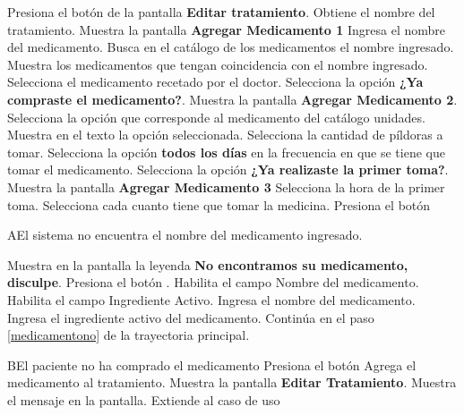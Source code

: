 \begin{UCtrayectoria}
	
	\UCpaso [\UCactor] Presiona el botón  de la pantalla \textbf{Editar tratamiento}.
	\UCpaso Obtiene el nombre del tratamiento.
	\UCpaso Muestra la pantalla \textbf{Agregar Medicamento 1}
	\UCpaso [\UCactor] Ingresa el nombre del medicamento.
	\UCpaso Busca en el catálogo de los medicamentos el nombre ingresado.
	\UCpaso Muestra los medicamentos que tengan coincidencia con el nombre ingresado.
	\UCpaso [\UCactor] Selecciona el medicamento recetado por el doctor.
	\UCpaso [\UCactor] Selecciona la opción \textbf{¿Ya compraste el medicamento?}.  \label{medicamentono}
	\UCpaso Muestra la pantalla \textbf{Agregar Medicamento 2}.
	\UCpaso [\UCactor] Selecciona la opción que corresponde al medicamento del catálogo unidades.
	\UCpaso Muestra en el texto la opción seleccionada.
	\UCpaso [\UCactor] Selecciona la cantidad de píldoras a tomar.
	\UCpaso [\UCactor] Selecciona la opción \textbf{todos los días} en la frecuencia en que se tiene que tomar el medicamento.
	\UCpaso [\UCactor] Selecciona la opción \textbf{¿Ya realizaste la primer toma?}. \label{frecuencia}
	\UCpaso Muestra la pantalla \textbf{Agregar Medicamento 3}
	\UCpaso [\UCactor] Selecciona la hora de la primer toma.
	\UCpaso [\UCactor] Selecciona cada cuanto tiene que tomar la medicina.
	\UCpaso [\UCactor] Presiona el botón 
	
\end{UCtrayectoria}

\begin{UCtrayectoriaA}{A}{El sistema no encuentra el nombre del medicamento ingresado.}
	
	\UCpaso Muestra en la pantalla la leyenda \textbf{No encontramos su medicamento, disculpe}.
	\UCpaso[\UCactor] Presiona el botón .
	\UCpaso Habilita el campo Nombre del medicamento.
	\UCpaso Habilita el campo Ingrediente Activo.
	\UCpaso [\UCactor] Ingresa el nombre del medicamento.
	\UCpaso [\UCactor] Ingresa el ingrediente activo del medicamento.
	\UCpaso Continúa en el paso \ref{medicamentono} de la trayectoria principal.
	
	
\end{UCtrayectoriaA}


\begin{UCtrayectoriaA}{B}{El paciente no ha comprado el medicamento}
	\UCpaso [\UCactor] Presiona el botón 
	\UCpaso Agrega el medicamento al tratamiento.
	\UCpaso Muestra la pantalla \textbf{Editar Tratamiento}.
	\UCpaso Muestra el mensaje  en la pantalla.
	\UCpaso Extiende al caso de uso 
\end{UCtrayectoriaA}


